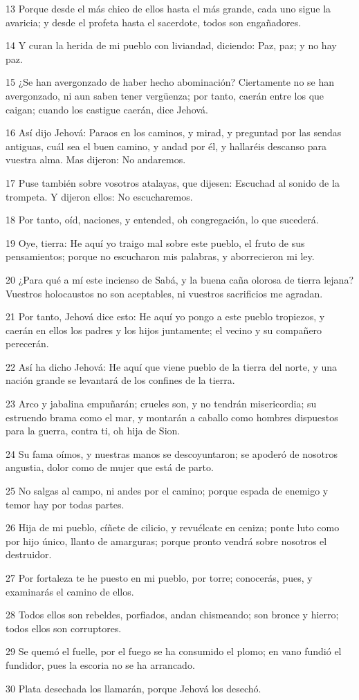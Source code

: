 \par 13 Porque desde el más chico de ellos hasta el más grande, cada uno sigue la avaricia; y desde el profeta hasta el sacerdote, todos son engañadores.
\par 14 Y curan la herida de mi pueblo con liviandad, diciendo: Paz, paz; y no hay paz. 
\par 15 ¿Se han avergonzado de haber hecho abominación? Ciertamente no se han avergonzado, ni aun saben tener vergüenza; por tanto, caerán entre los que caigan; cuando los castigue caerán, dice Jehová. 
\par 16 Así dijo Jehová: Paraos en los caminos, y mirad, y preguntad por las sendas antiguas, cuál sea el buen camino, y andad por él, y hallaréis descanso para vuestra alma. Mas dijeron: No andaremos.
\par 17 Puse también sobre vosotros atalayas, que dijesen: Escuchad al sonido de la trompeta. Y dijeron ellos: No escucharemos.
\par 18 Por tanto, oíd, naciones, y entended, oh congregación, lo que sucederá.
\par 19 Oye, tierra: He aquí yo traigo mal sobre este pueblo, el fruto de sus pensamientos; porque no escucharon mis palabras, y aborrecieron mi ley.
\par 20 ¿Para qué a mí este incienso de Sabá, y la buena caña olorosa de tierra lejana? Vuestros holocaustos no son aceptables, ni vuestros sacrificios me agradan.
\par 21 Por tanto, Jehová dice esto: He aquí yo pongo a este pueblo tropiezos, y caerán en ellos los padres y los hijos juntamente; el vecino y su compañero perecerán.
\par 22 Así ha dicho Jehová: He aquí que viene pueblo de la tierra del norte, y una nación grande se levantará de los confines de la tierra.
\par 23 Arco y jabalina empuñarán; crueles son, y no tendrán misericordia; su estruendo brama como el mar, y montarán a caballo como hombres dispuestos para la guerra, contra ti, oh hija de Sion.
\par 24 Su fama oímos, y nuestras manos se descoyuntaron; se apoderó de nosotros angustia, dolor como de mujer que está de parto.
\par 25 No salgas al campo, ni andes por el camino; porque espada de enemigo y temor hay por todas partes.
\par 26 Hija de mi pueblo, cíñete de cilicio, y revuélcate en ceniza; ponte luto como por hijo único, llanto de amarguras; porque pronto vendrá sobre nosotros el destruidor.
\par 27 Por fortaleza te he puesto en mi pueblo, por torre; conocerás, pues, y examinarás el camino de ellos.
\par 28 Todos ellos son rebeldes, porfiados, andan chismeando; son bronce y hierro; todos ellos son corruptores.
\par 29 Se quemó el fuelle, por el fuego se ha consumido el plomo; en vano fundió el fundidor, pues la escoria no se ha arrancado.
\par 30 Plata desechada los llamarán, porque Jehová los desechó.

